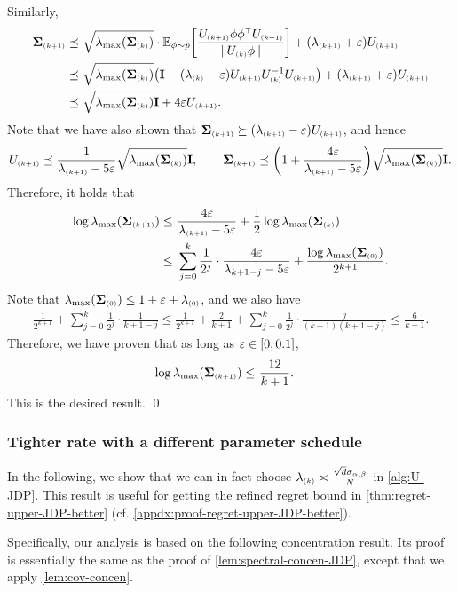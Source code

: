 Similarly,
\begin{align*}
    \cov\kp
    \preceq &~ \sqrt{ \lmax(\cov\kk) }\cdot \Ep{ \frac{U\kp \x\x\tp U\kp}{\nrm{U\kk\x}} } +(\lambda\kp+\eps) U\kp \\
    \preceq &~ \sqrt{ \lmax(\cov\kk) }\paren{ \id-(\lambda\kk-\eps)U\kp U\kk^{-1}U\kp } +(\lambda\kp+\eps) U\kp \\
    \preceq &~ \sqrt{ \lmax(\cov\kk) }\id+4\eps U\kp.
\end{align*}
Note that we have also shown that $\cov\kp\succeq (\lambda\kp-\eps)U\kp$, and hence
\begin{align*}
    U\kp\preceq \frac{1}{\lambda\kp-5\eps}\sqrt{ \lmax(\cov\kk) }\id, \qquad
    \cov\kp\preceq \paren{ 1+ \frac{4\eps}{\lambda\kp-5\eps}}\sqrt{ \lmax(\cov\kk) }\id.
\end{align*}
Therefore, it holds that
\begin{align*}
    \log\lmax(\cov\kp)\leq&~ \frac{4\eps}{\lambda\kp-5\eps}+\frac{1}{2}\log\lmax(\cov\kk)\\
    \leq&~ \sum_{j=0}^{k} \frac{1}{2^j}\cdot \frac{4\eps}{\lambda_{k+1-j}-5\eps}+\frac{\log\lmax(\cov\kz)}{2^{k+1}}.
\end{align*}
Note that $\lmax(\cov\kz)\leq 1+\eps+\lambda\kz$, and we also have
\begin{align*}
    \frac{1}{2^{k+1}}+\sum_{j=0}^{k} \frac{1}{2^j}\cdot \frac{1}{k+1-j}\leq \frac{1}{2^{k+1}}+\frac{2}{k+1}+\sum_{j=0}^{k} \frac{1}{2^j}\cdot \frac{j}{(k+1)(k+1-j)} \leq \frac{6}{k+1}.
\end{align*}
Therefore, we have proven that as long as $\eps\in[0,0.1]$,
\begin{align*}
    \log\lmax(\cov\kp)\leq&~ \frac{12}{k+1}.
\end{align*}
This is the desired result.
\qed



\subsubsection{Tighter rate with a different parameter schedule}

In the following, we show that we can in fact choose $\lambda\kk\asymp \frac{\sqrt{d}\siga}{N}$ in \cref{alg:U-JDP}. This result is useful for getting the refined regret bound in \cref{thm:regret-upper-JDP-better} (cf. \cref{appdx:proof-regret-upper-JDP-better}).


Specifically, our analysis is based on the following concentration result. Its proof is essentially the same as the proof of \cref{lem:spectral-concen-JDP}, except that we apply \cref{lem:cov-concen}.

